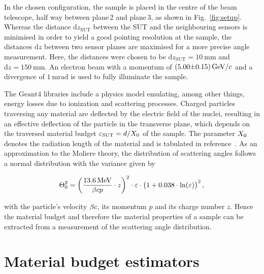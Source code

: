 \documentclass{PoS}
\newcommand{\eV}{\ensuremath{\textrm{eV}}}
\newcommand{\cspeed}{\ensuremath{\mathnormal{c}}}
\newcommand{\dz}{\ensuremath{\textrm{d}z}}
\newcommand{\dzsut}{\ensuremath{\textrm{d}z_{\textrm{SUT}}}}
\newcommand{\xzero}{\ensuremath{\mathnormal{X}_0}}
\newcommand{\Geant}{\ensuremath{\textrm{Geant4}}}
\begin{document}
In the chosen configuration, the sample is placed in the centre of the beam telescope, half way between plane\,2 and plane\,3, as shown in Fig.~\ref{fig:setup}. %
Whereas the distance $\dzsut$ between the SUT and the neighbouring sensors is minimised in order to yield a good pointing resolution at the sample,
 the distances $\dz$ between two sensor planes are maximised for a more precise angle measurement.
Here, the distances were chosen to be $\dzsut =\SI{10}{\mm}$ and $\dz=\SI{150}{\mm}$. 
An electron beam with a momentum of $\SI{5.00(15)}{\giga\eV/\cspeed}$ and a divergence of $\SI{1}{\milli\radian}$ is used to fully illuminate the sample. 

The $\Geant$ libraries include a physics model emulating, among other things, energy losses due to ionization and scattering processes.
Charged particles traversing any material are deflected by the electric field of the nuclei, resulting in an effective deflection of the particle in the transverse plane,
 which depends on the traversed material budget $\varepsilon_{\textrm{SUT}} = d / \xzero$ of the sample. 
The parameter $\xzero$ denotes the radiation length of the material and is tabulated in reference~\cite{ref:pdg2016}. 
As an approximation to the Moliere theory, the distribution of scattering angles follows a normal distribution with the variance given by~\cite{ref:scatteringhighland, ref:pdg2016} 

\begin{equation}
 \Theta_0^2 = \left( \frac{\SI{13.6}{\mega\eV}}{\beta \cspeed p}\cdot z \right)^2 \cdot \varepsilon \cdot \big( 1+0.038\cdot\ln(\varepsilon) \big)^2\,,
 \label{eq:highland}
\end{equation}

\noindent
with the particle's velocity $\beta \cspeed$, its momentum $p$ and its charge number $z$. 
Hence the material budget and therefore the material properties of a sample can be extracted from a measurement of the scattering angle distribution.


\section{Material budget estimators}
\end{document}

